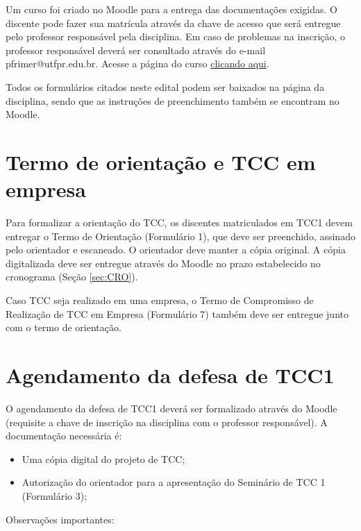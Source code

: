 \documentclass[a4paper, 12pt]{article}
\begin{document}
    Um curso foi criado no Moodle para a entrega das  documentações exigidas. O discente pode fazer sua matrícula através da chave de acesso que será entregue pelo professor responsável pela disciplina. Em caso de problemas na inscrição, o professor responsável deverá ser consultado através do e-mail pfrimer@utfpr.edu.br. Acesse a página do curso \href{https://moodle.td.utfpr.edu.br/course/view.php?id=507}{clicando aqui}.
    
    Todos os formulários citados neste edital podem ser baixados na página da disciplina, sendo que as instruções de preenchimento também se encontram no Moodle.
    
    \section{Termo de orientação e TCC em empresa}
    
    Para formalizar a orientação do TCC, os discentes matriculados em TCC1 devem entregar o Termo de Orientação (Formulário 1), que deve ser preenchido, assinado pelo orientador e escaneado. O orientador deve manter a cópia original. A cópia digitalizada deve ser entregue através do Moodle no prazo estabelecido no cronograma (Seção \ref{sec:CRO}).
    
    Caso TCC seja realizado em uma empresa, o Termo de Compromisso de Realização de TCC em Empresa (Formulário 7) também deve ser entregue junto com o termo de orientação.

    \section{Agendamento da defesa de TCC1}

    O agendamento da defesa de TCC1 deverá ser formalizado através do Moodle (requisite a chave de inscrição na disciplina com o professor responsável). A documentação necessária é:
    
    \begin{itemize}
    	\item Uma cópia digital do projeto de TCC;
    	\item Autorização do orientador para a apresentação do Seminário de TCC 1 (Formulário 3);
    \end{itemize}
		
    Observações importantes:
    
\end{document}
